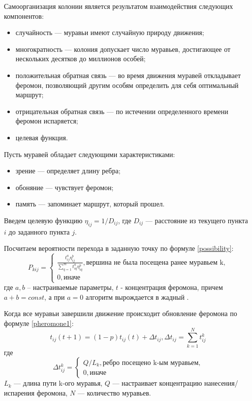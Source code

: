 \documentclass[12pt]{report}
\begin{document}
Самоорганизация колонии является результатом взаимодействия следующих компонентов:
\begin{itemize}
	\item случайность — муравьи имеют случайную природу движения;
	\item многократность — колония допускает число муравьев, достигающее от нескольких десятков до миллионов особей;
	\item положительная обратная связь — во время движения муравей откладывает феромон, позволяющий другим особям определить для себя оптимальный маршрут;
	\item отрицательная обратная связь — по истечении определенного времени феромон испаряется;
	\item целевая функция.
\end{itemize}

Пусть муравей обладает следующими характеристиками:
\begin{itemize}
	\item зрение — определяет длину ребра;
	\item обоняние — чувствует феромон;
	\item память — запоминает маршрут, который прошел.
\end{itemize}

Введем целевую функцию $\eta_{ij} = 1 / D_{ij}$, где $D_{ij}$ — расстояние из текущего пункта $i$ до заданного пункта $j$.

Посчитаем вероятности перехода в заданную точку по формуле \eqref{possibility}:
\begin{equation}
	\label{possibility}
	P_{kij} = \begin{cases}
		\frac{t_{ij}^a\eta_{ij}^b}{\sum_{q=1}^m t^a_{iq}\eta^b_{iq}}, \textrm{вершина не была посещена ранее муравьем k,} \\
		0, \textrm{иначе}
	\end{cases}
\end{equation}
где $a, b$ -- настраиваемые параметры, $t$ - концентрация феромона, причем $a + b = const$, а при $a = 0$ алгоритм вырождается в жадный \cite{Levitin}.

Когда все муравьи завершили движение происходит обновление феромона по формуле \eqref{pheromone1}:
\begin{equation}
	\label{pheromone1}
	t_{ij}(t+1) = (1-p)t_{ij}(t) + \Delta t_{ij}, \Delta t_{ij} = \sum_{k=1}^N t^k_{ij}
\end{equation}
где
\begin{equation}
	\label{pheromone2}
	\Delta t^k_{ij} = \begin{cases}
		Q/L_{k}, \textrm{ребро посещено k-ым муравьем,} \\
		0, \textrm{иначе}
	\end{cases}
\end{equation}
$L_{k}$ — длина пути k-ого муравья, $Q$ — настраивает концентрацию нанесения/испарения феромона, $N$ — количество муравьев.
\end{document}
